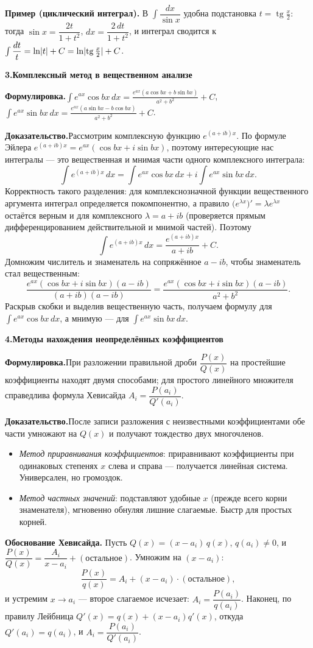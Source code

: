 \documentclass[10pt,a4paper]{article}
\DeclareMathOperator{\tg}{tg}
\newcommand{\dx}{\,dx}
\DeclarePairedDelimiter{\abs}{\lvert}{\rvert}
\theoremstyle{definition}
\theoremstyle{plain}
\newcommand{\writespace}{\vspace{7.5mm}}
\newcommand{\prf}[2]{%
  \par\writespace\noindent
  {\large\bfseries\color{accent}#1.\enspace #2}\par\smallskip}
\newcommand{\stmt}{\par\noindent\textbf{Формулировка.}\enspace}
\newcommand{\dok}{\par\noindent\textbf{Доказательство.}\enspace}
\begin{document}
\smallskip
\noindent\textbf{Пример (циклический интеграл).} В $\int\dfrac{dx}{\sin x}$ удобна подстановка
$t=\tg\tfrac x2$: тогда $\sin x=\dfrac{2t}{1+t^2}$, $dx=\dfrac{2\,dt}{1+t^2}$, и интеграл
сводится к $\int\dfrac{dt}{t}=\ln\abs{t}+C=\ln\abs{\tg\tfrac x2}+C$.

\prf{3}{Комплексный метод в вещественном анализе}
\stmt $\displaystyle\int e^{ax}\cos bx\dx=\frac{e^{ax}(a\cos bx+b\sin bx)}{a^2+b^2}+C$,\quad
$\displaystyle\int e^{ax}\sin bx\dx=\frac{e^{ax}(a\sin bx-b\cos bx)}{a^2+b^2}+C$.

\dok Рассмотрим комплексную функцию $e^{(a+ib)x}$. По формуле Эйлера
$e^{(a+ib)x}=e^{ax}(\cos bx+i\sin bx)$, поэтому интересующие нас интегралы — это вещественная и
мнимая части одного комплексного интеграла:
\[
  \int e^{(a+ib)x}\dx=\int e^{ax}\cos bx\dx+i\int e^{ax}\sin bx\dx .
\]
Корректность такого разделения: для комплекснозначной функции вещественного аргумента интеграл
определяется покомпонентно, а правило $\bigl(e^{\lambda x}\bigr)'=\lambda e^{\lambda x}$ остаётся
верным и для комплексного $\lambda=a+ib$ (проверяется прямым дифференцированием действительной и
мнимой частей). Поэтому
\[
  \int e^{(a+ib)x}\dx=\frac{e^{(a+ib)x}}{a+ib}+C .
\]
Домножим числитель и знаменатель на сопряжённое $a-ib$, чтобы знаменатель стал вещественным:
\[
  \frac{e^{ax}(\cos bx+i\sin bx)(a-ib)}{(a+ib)(a-ib)}
  =\frac{e^{ax}(\cos bx+i\sin bx)(a-ib)}{a^2+b^2}.
\]
Раскрыв скобки и выделив вещественную часть, получаем формулу для $\int e^{ax}\cos bx\dx$, а мнимую
— для $\int e^{ax}\sin bx\dx$.

\prf{4}{Методы нахождения неопределённых коэффициентов}
\stmt При разложении правильной дроби $\dfrac{P(x)}{Q(x)}$ на простейшие коэффициенты находят
двумя способами; для простого линейного множителя справедлива формула Хевисайда
$A_i=\dfrac{P(a_i)}{Q'(a_i)}$.

\dok После записи разложения с неизвестными коэффициентами обе части умножают на $Q(x)$ и
получают тождество двух многочленов.
\begin{itemize}[leftmargin=*,nosep]
  \item \emph{Метод приравнивания коэффициентов}: приравнивают коэффициенты при одинаковых
        степенях $x$ слева и справа — получается линейная система. Универсален, но громоздок.
  \item \emph{Метод частных значений}: подставляют удобные $x$ (прежде всего корни знаменателя),
        мгновенно обнуляя лишние слагаемые. Быстр для простых корней.
\end{itemize}
\textbf{Обоснование Хевисайда.} Пусть $Q(x)=(x-a_i)\,q(x)$, $q(a_i)\ne0$, и
$\dfrac{P(x)}{Q(x)}=\dfrac{A_i}{x-a_i}+(\text{остальное})$. Умножим на $(x-a_i)$:
\[
  \frac{P(x)}{q(x)}=A_i+(x-a_i)\cdot(\text{остальное}),
\]
и устремим $x\to a_i$ — второе слагаемое исчезает: $A_i=\dfrac{P(a_i)}{q(a_i)}$. Наконец, по
правилу Лейбница $Q'(x)=q(x)+(x-a_i)q'(x)$, откуда $Q'(a_i)=q(a_i)$, и
$A_i=\dfrac{P(a_i)}{Q'(a_i)}$.
\end{document}
